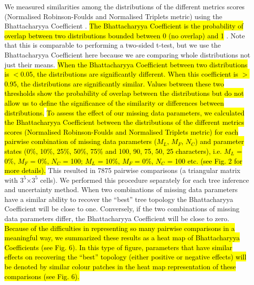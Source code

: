\documentclass[12pt,letterpaper]{article}
\begin{document}
We measured similarities among the distributions of the different metrics scores (Normalised Robinson-Foulds and Normalised Triplets metric) using the Bhattacharyya Coefficient \citep{Bhattacharyya}.
\hl{The Bhattacharyya Coefficient is the probability of overlap between two distributions bounded between 0 (no overlap) and 1 }\citep[\hl{full overlap;}][\hl{see Appendix B for calculation details}]{Bhattacharyya}.
Note that this is comparable to performing a two-sided t-test, but we use the Bhattacharyya Coefficient here because we are comparing whole distributions not just their means.
\hl{When the Bhattacharyya Coefficient between two distributions is $<$0.05, the distributions are significantly different.
When this coefficient is $>$0.95, the distributions are significantly similar.
Values between these two thresholds show the probability of overlap between the distributions but do not allow us to define the significance of the similarity or differences between distributions.}
\hl{To assess the effect of our missing data parameters, we calculated the Bhattacharyya Coefficient between the distributions of the different metrics scores (Normalised Robinson-Foulds and Normalised Triplets metric) for each pairwise combination of missing data parameters ($M_{L}$, $M_{F}$, $N_{C}$) and parameter states (0\%, 10\%, 25\%, 50\%, 75\% and 100, 90, 75, 50, 25 characters), i.e. $M_{L}$ = 0\%, $M_{F}$ = 0\%, $N_{C}$ = 100; $M_{L}$ = 10\%, $M_{F}$ = 0\%, $N_{C}$ = 100 etc. (see Fig. 2 for more details).}
This resulted in 7875 pairwise comparisons (a triangular matrix with $3^5$$\times$$3^5$ cells).
We performed this procedure separately for each tree inference and uncertainty method.
When two combinations of missing data parameters have a similar ability to recover the ``best'' tree topology the Bhattacharyya Coefficient will be close to one.
Conversely, if the two combinations of missing data parameters differ, the Bhattacharyya Coefficient will be close to zero.
\hl{Because of the difficulties in representing so many pairwise comparisons in a meaningful way, we summarized these results as a heat map of Bhattacharyya Coefficients (see Fig. 6).
In this type of figure, parameters that have similar effects on recovering the ``best'' topology (either positive or negative effects) will be denoted by similar colour patches in the heat map representation of these comparisons (see Fig. 6).}

\end{document}
